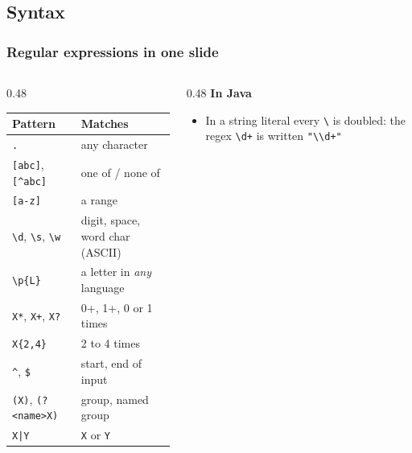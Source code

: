 \documentclass[aspectratio=169,10pt,compress]{beamer}
\begin{document}

\subsection[Syntax]{Syntax}




\begin{frame}[t,fragile] \frametitle{Regular expressions in one slide}
  \footnotesize
  \begin{columns}[T]
    \begin{column}{0.48\textwidth}
      \begin{tabular}{@{}ll@{}}
        \toprule
        \textbf{Pattern} & \textbf{Matches} \\
        \midrule
        \texttt{.}                & any character \\
        \texttt{[abc]}, \texttt{[\textasciicircum abc]} & one of / none of \\
        \texttt{[a-z]}            & a range \\
        \texttt{\textbackslash d}, \texttt{\textbackslash s}, \texttt{\textbackslash w} & digit, space, word char (ASCII) \\
        \texttt{\textbackslash p\{L\}}  & a letter in \emph{any} language \\
        \texttt{X*}, \texttt{X+}, \texttt{X?} & 0+, 1+, 0 or 1 times \\
        \texttt{X\{2,4\}}         & 2 to 4 times \\
        \texttt{\textasciicircum}, \texttt{\$} & start, end of input \\
        \texttt{(X)}, \texttt{(?<name>X)} & group, named group \\
        \texttt{X|Y}              & \texttt{X} or \texttt{Y} \\
        \bottomrule
      \end{tabular}
    \end{column}
    \begin{column}{0.48\textwidth}
      \textbf{In Java}
      \begin{itemize}
        \item In a string literal every \texttt{\textbackslash} is doubled: the regex \texttt{\textbackslash d+} is written \texttt{"\textbackslash\textbackslash d+"}

\end{itemize}
\end{column}
\end{columns}
\end{frame}
\end{document}
